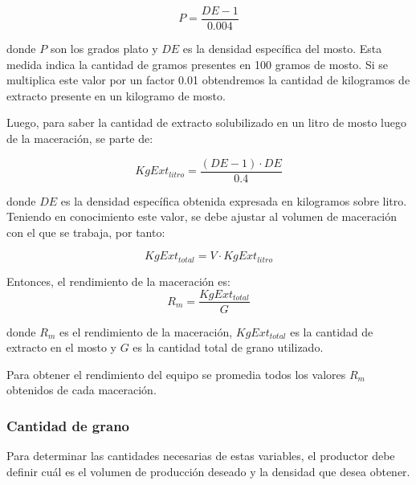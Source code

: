                 \begin{equation}
                    P = \frac{DE -1}{0.004}
                \end{equation}
                
                \noindent donde $P$ son los grados plato y $DE$ es la densidad específica del mosto. Esta medida indica la cantidad de gramos presentes en 100 gramos de mosto. Si se multiplica este valor por un factor 0.01  obtendremos la cantidad de kilogramos de extracto presente en un kilogramo de mosto.
                
                \par Luego, para saber la cantidad de extracto solubilizado en un litro de mosto luego de la maceración, se parte de:
                    
                    \begin{equation}
                        KgExt_{litro} = \frac{(DE-1) \cdot DE}{0.4}
                    \end{equation}
                    
                    \noindent donde $DE$ es la densidad específica obtenida expresada en kilogramos sobre litro. Teniendo en conocimiento este valor, se debe ajustar al volumen de maceración con el que se trabaja, por tanto:
                    
                    \begin{equation}
                        KgExt_{total} = V \cdot KgExt_{litro}
                        \label{EcuacionExtractoTotal}
                    \end{equation}
                
                Entonces, el rendimiento de la maceración es:
                \begin{equation}
                    R_m = \frac{KgExt_{total}}{G}
                    \label{EcuacionRendimientoMaceracion}
                \end{equation}
                
                \noindent donde $R_m$ es el rendimiento de la maceración, $KgExt_{total}$ es la cantidad de extracto en el mosto y $G$ es la cantidad total de grano utilizado.
                
                \par Para obtener el rendimiento del equipo se promedia todos los valores $R_m$ obtenidos de cada maceración.
            
            \subsubsection{Cantidad de grano}
            \label{AT_CalculodeCantGrano}
                \par Para determinar las cantidades necesarias de estas variables, el productor debe definir cuál es el volumen de producción deseado y la densidad que desea obtener.
                

